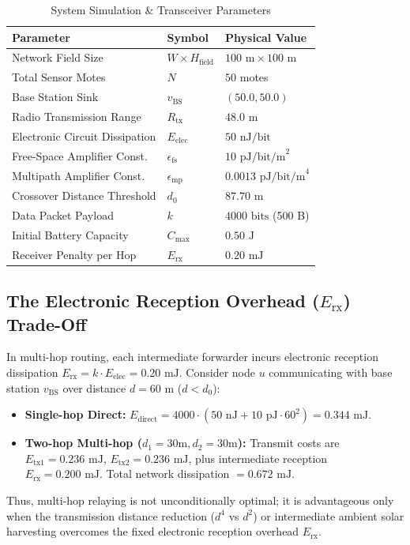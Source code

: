 \documentclass[journal]{IEEEtran}
\begin{document}
\begin{table}[!t]
\caption{System Simulation & Transceiver Parameters}
\label{tab:params}
\centering
\begin{tabular}{@{}lll@{}}
\toprule
\textbf{Parameter} & \textbf{Symbol} & \textbf{Physical Value} \\
\midrule
Network Field Size & $W \times H_{\text{field}}$ & $100\text{ m} \times 100\text{ m}$ \\
Total Sensor Motes & $N$ & $50$ motes \\
Base Station Sink & $v_{\text{BS}}$ & $(50.0, 50.0)$ \\
Radio Transmission Range & $R_{\text{tx}}$ & $48.0\text{ m}$ \\
Electronic Circuit Dissipation & $E_{\text{elec}}$ & $50\text{ nJ/bit}$ \\
Free-Space Amplifier Const. & $\epsilon_{\text{fs}}$ & $10\text{ pJ/bit/m}^2$ \\
Multipath Amplifier Const. & $\epsilon_{\text{mp}}$ & $0.0013\text{ pJ/bit/m}^4$ \\
Crossover Distance Threshold & $d_0$ & $87.70\text{ m}$ \\
Data Packet Payload & $k$ & $4000\text{ bits}$ (500 B) \\
Initial Battery Capacity & $C_{\text{max}}$ & $0.50\text{ J}$ \\
Receiver Penalty per Hop & $E_{\text{rx}}$ & $0.20\text{ mJ}$ \\
\bottomrule
\end{tabular}
\end{table}

\subsection{The Electronic Reception Overhead ($E_{\text{rx}}$) Trade-Off}
In multi-hop routing, each intermediate forwarder incurs electronic reception dissipation $E_{\text{rx}} = k \cdot E_{\text{elec}} = 0.20\text{ mJ}$. Consider node $u$ communicating with base station $v_{\text{BS}}$ over distance $d = 60\text{ m}$ ($d < d_0$):
\begin{itemize}
    \item \textbf{Single-hop Direct:} $E_{\text{direct}} = 4000 \cdot (50\text{ nJ} + 10\text{ pJ} \cdot 60^2) = 0.344\text{ mJ}$.
    \item \textbf{Two-hop Multi-hop ($d_1 = 30\text{m}, d_2 = 30\text{m}$):} Transmit costs are $E_{\text{tx1}} = 0.236\text{ mJ}$, $E_{\text{tx2}} = 0.236\text{ mJ}$, plus intermediate reception $E_{\text{rx}} = 0.200\text{ mJ}$. Total network dissipation $= 0.672\text{ mJ}$.
\end{itemize}
Thus, multi-hop relaying is not unconditionally optimal; it is advantageous only when the transmission distance reduction ($d^4$ vs $d^2$) or intermediate ambient solar harvesting overcomes the fixed electronic reception overhead $E_{\text{rx}}$.
\end{document}
